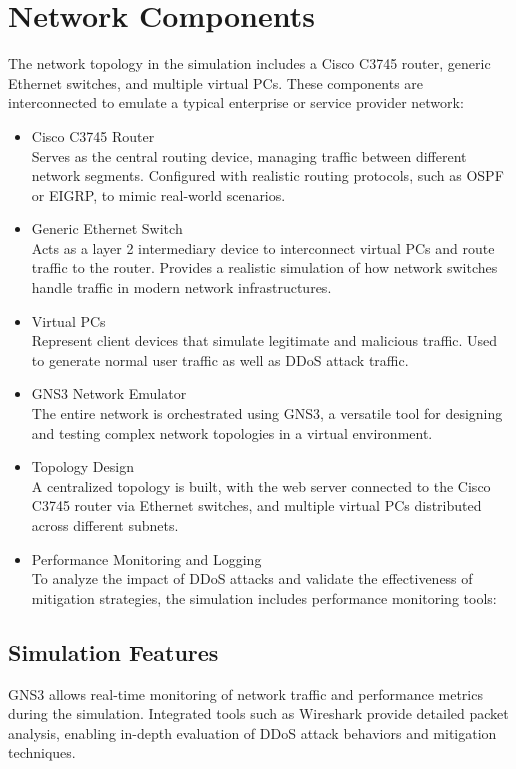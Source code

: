 \section{Network Components}
The network topology in the simulation includes a Cisco C3745 router, generic Ethernet switches, and multiple virtual PCs. These components are interconnected to emulate a typical enterprise or service provider network:
\begin{itemize}
    \item Cisco C3745 Router
    \\ Serves as the central routing device, managing traffic between different network segments. Configured with realistic routing protocols, such as OSPF or EIGRP, to mimic real-world scenarios.
    \item Generic Ethernet Switch
    \\ Acts as a layer 2 intermediary device to interconnect virtual PCs and route traffic to the router. Provides a realistic simulation of how network switches handle traffic in modern network infrastructures.
    \item Virtual PCs
    \\ Represent client devices that simulate legitimate and malicious traffic. Used to generate normal user traffic as well as DDoS attack traffic.
    \item GNS3 Network Emulator
    \\ The entire network is orchestrated using GNS3, a versatile tool for designing and testing complex network topologies in a virtual environment.
    \item Topology Design
    \\ A centralized topology is built, with the web server connected to the Cisco C3745 router via Ethernet switches, and multiple virtual PCs distributed across different subnets. 
    \item Performance Monitoring and Logging
    \\ To analyze the impact of DDoS attacks and validate the effectiveness of mitigation strategies, the simulation includes performance monitoring tools:
\end{itemize}
\subsection{Simulation Features}
GNS3 allows real-time monitoring of network traffic and performance metrics during the simulation. Integrated tools such as Wireshark provide detailed packet analysis, enabling in-depth evaluation of DDoS attack behaviors and mitigation techniques.
